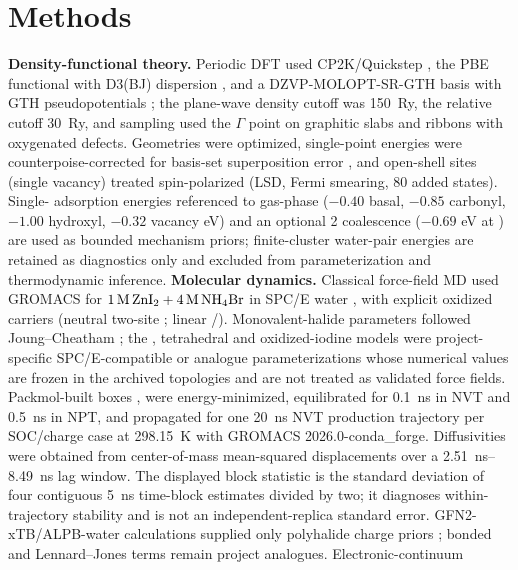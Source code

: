 \documentclass[11pt]{article}
\begin{document}
\section*{Methods}
\textbf{Density-functional theory.} Periodic DFT used CP2K/Quickstep
\citep{Kuhne2020CP2K,VandeVondele2005Quickstep}, the PBE functional with D3(BJ) dispersion
\citep{Perdew1996PBE,Grimme2010D3,Grimme2011D3BJ}, and a DZVP-MOLOPT-SR-GTH basis
\citep{VandeVondele2007MOLOPT} with GTH pseudopotentials
\citep{Goedecker1996GTH,Hartwigsen1998GTH,Krack2005GTHPBE}; the plane-wave density cutoff was
\SI{150}{Ry}, the relative cutoff \SI{30}{Ry}, and sampling used the $\Gamma$ point on
graphitic slabs and ribbons with oxygenated defects. Geometries were optimized, single-point energies were
counterpoise-corrected for basis-set superposition error \citep{Boys1970Counterpoise}, and open-shell sites (single vacancy) treated
spin-polarized (LSD, Fermi smearing, 80 added states). Single- adsorption energies referenced to
gas-phase  ($-0.40$ basal, $-0.85$ carbonyl, $-1.00$ hydroxyl, $-0.32$ vacancy eV) and an optional
2 coalescence ($-0.69$ eV at ) are used as bounded mechanism priors; finite-cluster
water-pair energies are retained as diagnostics only and excluded from parameterization and thermodynamic
inference. \textbf{Molecular
dynamics.} Classical force-field MD used GROMACS \citep{Abraham2015GROMACS} for
$1\,\si{M}\,\ce{ZnI2}+4\,\si{M}\,\ce{NH4Br}$ in SPC/E water \citep{Berendsen1987SPCE}, with explicit
oxidized carriers (neutral two-site ; linear /). Monovalent-halide parameters
followed Joung--Cheatham \citep{Joung2008Ions}; the , tetrahedral  and oxidized-iodine
models were project-specific SPC/E-compatible or analogue parameterizations whose numerical values are frozen
in the archived topologies and are not treated as validated force fields. Packmol-built boxes
\citep{Martinez2009Packmol},
were energy-minimized, equilibrated for \SI{0.1}{ns} in NVT and \SI{0.5}{ns} in NPT, and propagated for
one \SI{20}{ns} NVT production trajectory per SOC/charge case at \SI{298.15}{K} with GROMACS
2026.0-conda\_forge. Diffusivities were obtained from center-of-mass mean-squared displacements over a
\SIrange{2.51}{8.49}{ns} lag window. The displayed block statistic is the standard deviation of four contiguous
\SI{5}{ns} time-block estimates divided by two; it diagnoses within-trajectory stability and is not an
independent-replica standard error. GFN2-xTB/ALPB-water calculations supplied only polyhalide charge priors
\citep{Bannwarth2019GFN2xTB}; bonded and Lennard--Jones terms remain project analogues. Electronic-continuum
\end{document}
